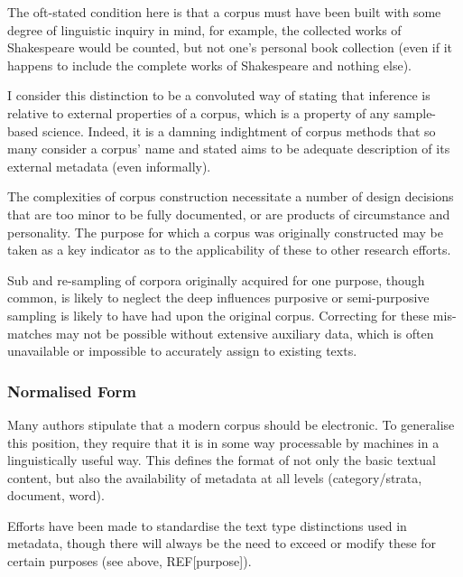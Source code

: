 The oft-stated condition here is that a corpus must have been built with some degree of linguistic inquiry in mind, for example, the collected works of Shakespeare would be counted, but not one's personal book collection (even if it happens to include the complete works of Shakespeare and nothing else). %

I consider this distinction to be a convoluted way of stating that inference is relative to external properties of a corpus, which is a property of any sample-based science.  Indeed, it is a damning indightment of corpus methods that so many consider a corpus' name and stated aims to be adequate description of its external metadata (even informally).  

The complexities of corpus construction necessitate a number of design decisions that are too minor to be fully documented, or are products of circumstance and personality.  The purpose for which a corpus was originally constructed may be taken as a key indicator as to the applicability of these to other research efforts.

Sub and re-sampling of corpora originally acquired for one purpose, though common, is likely to neglect the deep influences purposive or semi-purposive sampling is likely to have had upon the original corpus.  Correcting for these mis-matches may not be possible without extensive auxiliary data, which is often unavailable or impossible to accurately assign to existing texts.





\subsubsection{Normalised Form}
Many authors stipulate that a modern corpus should be electronic.  To generalise this position, they require that it is in some way processable by machines in a linguistically useful way.  This defines the format of not only the basic textual content, but also the availability of metadata at all levels (category/strata, document, word).

Efforts have been made %
%
%
to standardise the text type distinctions used in metadata, though there will always be the need to exceed or modify these for certain purposes (see above, REF[purpose]).

